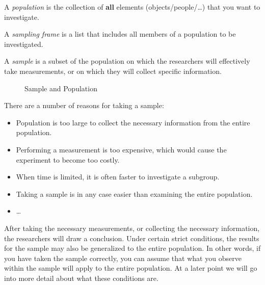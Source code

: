 \begin{definition}[Population]
    A \emph{population} is the collection of \textbf{all} elements (objects/people/\ldots) that you want to investigate.
\end{definition}

\begin{definition}
    A \emph{sampling frame} is a list that includes all members of a population to be investigated.
\end{definition}

\begin{definition}[Sample]
    A \emph{sample} is a subset of the population on which the researchers will effectively take measurements, or on which they will collect specific information.
\end{definition}

\begin{figure}
    \begin{center}
    \end{center}
    \caption{Sample and Population}
    \label{img:populatie-steekproef}
\end{figure}

There are a number of reasons for taking a sample:

\begin{itemize}
    \item Population is too large to collect the necessary information from the entire population.
    \item Performing a measurement is too expensive, which would cause the experiment to become too costly.
    \item When time is limited, it is often faster to investigate a subgroup.
    \item Taking a sample is in any case easier than examining the entire population.
    \item \dots
\end{itemize}

After taking the necessary measurements, or collecting the necessary information, the researchers will draw a conclusion. Under certain strict conditions, the results for the sample may also be generalized to the entire population. In other words, if you have taken the sample correctly, you can assume that what you observe within the sample will apply to the entire population. At a later point we will go into more detail about what these conditions are.

